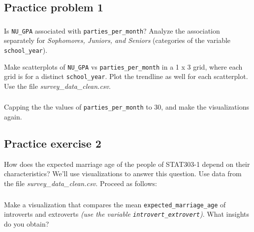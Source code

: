 \documentclass[
  letterpaper,
  DIV=11,
  numbers=noendperiod]{scrreprt}
\begin{document}
\hypertarget{practice-problem-1}{%
\subsection{Practice problem 1}\label{practice-problem-1}}

\hypertarget{section-39}{%
\subsubsection{}\label{section-39}}

Is \texttt{NU\_GPA} associated with \texttt{parties\_per\_month}?
Analyze the association separately for \emph{Sophomores, Juniors, and
Seniors} (categories of the variable \texttt{school\_year}).

Make scatterplots of \texttt{NU\_GPA} vs \texttt{parties\_per\_month} in
a 1 x 3 grid, where each grid is for a distinct \texttt{school\_year}.
Plot the trendline as well for each scatterplot. Use the file
\emph{survey\_data\_clean.csv}.

\hypertarget{section-40}{%
\subsubsection{}\label{section-40}}

Capping the the values of \texttt{parties\_per\_month} to 30, and make
the visualizations again.

\hypertarget{practice-exercise-2-3}{%
\subsection{Practice exercise 2}\label{practice-exercise-2-3}}

How does the expected marriage age of the people of STAT303-1 depend on
their characteristics? We'll use visualizations to answer this question.
Use data from the file \emph{survey\_data\_clean.csv.} Proceed as
follows:

\hypertarget{section-41}{%
\subsubsection{}\label{section-41}}

Make a visualization that compares the mean
\texttt{expected\_marriage\_age} of introverts and extroverts \emph{(use
the variable \texttt{introvert\_extrovert})}. What insights do you
obtain?

\hypertarget{section-42}{%
\subsubsection{}\label{section-42}}
\end{document}
